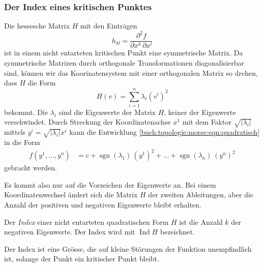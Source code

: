 %
%
\subsubsection{Der Index eines kritischen Punktes}
Die hessesche Matrix $H$ mit den Einträgen
\[
h_{kl} = \frac{\partial^2 f}{\partial x^k\,\partial x^l}
\]
ist in einem nicht entarteten kritischen Punkt eine symmetrische
Matrix.
Da symmetrische Matrizen durch orthogonale Transformationen
diagonalisierbar sind, können wir das Koorinatensystem mit
einer orthogonalen Matrix so drehen, dass $H$ die Form
\[
H(v)
=
\sum_{i=1}^n \lambda_i (v^i)^2
\]
bekommt.
Die $\lambda_i$ sind die Eigenwerte der Matrix $H$, keiner
der Eigenwerte verschwindet.
Durch Streckung der Koordinatenachse $x^1$ mit dem Faktor
$\!\sqrt{|\lambda_i|}$  mittels
$y^i = \!\sqrt{|\lambda_i|}x^i$ kann die Entwicklung
\eqref{buch:topologie:morse:eqn:quadratisch}
in die Form
\begin{align*}
f(y^1,\dots,y^n)
&=
c
+
\operatorname{sgn}(\lambda_1)\,(y^1)^2
+
\dots
+
\operatorname{sgn}(\lambda_n)\,(y^n)^2
\end{align*}
gebracht werden.

Es kommt also nur auf die Vorzeichen der Eigenwerte an.
Bei einem Koordinatenwechsel ändert sich die Matrix $H$ der zweiten
Ableitungen, aber die Anzahl der positiven und negativen Eigenwerte
bleibt erhalten.

\begin{definition}[Index]
%
Der \emph{Index} einer nicht entarteten quadratischen Form $H$ ist die
Anzahl $k$ der negativen Eigenwerte.
Der Index wird mit $\operatorname{Ind}H$ bezeichnet.
%
\end{definition}

Der Index ist eine Grösse, die auf kleine Störungen der Funktion
unempfindlich ist, solange der Punkt ein kritischer Punkt bleibt.

%
%

